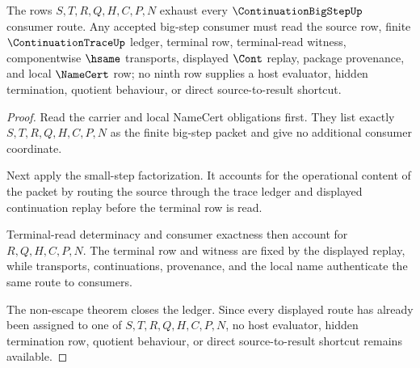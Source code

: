 \begin{theorem}
\label{thm:continuation-big-step-ledger-totality}
The rows $S,T,R,Q,H,C,P,N$ exhaust every $\ContinuationBigStepUp$ consumer route. Any accepted big-step consumer must read the source row, finite $\ContinuationTraceUp$ ledger, terminal row, terminal-read witness, componentwise $\hsame$ transports, displayed $\Cont$ replay, package provenance, and local $\NameCert$ row; no ninth row supplies a host evaluator, hidden termination, quotient behaviour, or direct source-to-result shortcut.
\end{theorem}
\begin{proof}
Read the carrier and local NameCert obligations first. They list exactly $S,T,R,Q,H,C,P,N$ as the finite big-step packet and give no additional consumer coordinate.

Next apply the small-step factorization. It accounts for the operational content of the packet by routing the source through the trace ledger and displayed continuation replay before the terminal row is read.

Terminal-read determinacy and consumer exactness then account for $R,Q,H,C,P,N$. The terminal row and witness are fixed by the displayed replay, while transports, continuations, provenance, and the local name authenticate the same route to consumers.

The non-escape theorem closes the ledger. Since every displayed route has already been assigned to one of $S,T,R,Q,H,C,P,N$, no host evaluator, hidden termination row, quotient behaviour, or direct source-to-result shortcut remains available.
\end{proof}

